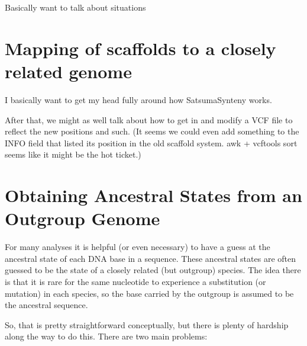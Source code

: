 \documentclass[]{krantz}
\begin{document}
Basically want to talk about situations

\hypertarget{mapping-of-scaffolds-to-a-closely-related-genome}{%
\section{Mapping of scaffolds to a closely related genome}\label{mapping-of-scaffolds-to-a-closely-related-genome}}

I basically want to get my head fully around how SatsumaSynteny works.

After that, we might as well talk about how to get in and modify a VCF file to reflect the new positions and such. (It seems we could even add something to the INFO field that listed its position in the old scaffold system. awk + vcftools sort seems like it might be the hot ticket.)

\hypertarget{obtaining-ancestral-states-from-an-outgroup-genome}{%
\section{Obtaining Ancestral States from an Outgroup Genome}\label{obtaining-ancestral-states-from-an-outgroup-genome}}

For many analyses it is helpful (or even necessary) to have a guess at the ancestral
state of each DNA base in a sequence. These ancestral states are often guessed to be the
state of a closely related (but outgroup) species. The idea there is that it is rare for
the same nucleotide to experience a substitution (or mutation) in each species, so the
base carried by the outgroup is assumed to be the ancestral sequence.

So, that is pretty straightforward conceptually, but there is plenty of hardship
along the way to do this. There are two main problems:
\end{document}
